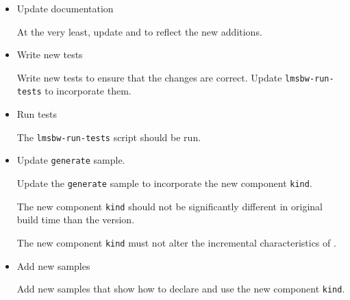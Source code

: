 \begin{itemize}
\item Update documentation

  At the very least, update  and 
  to reflect the new additions.

\item Write new tests

  Write new tests to ensure that the changes are correct.  Update
  \texttt{lmsbw-run-tests} to incorporate them.

\item Run tests

  The \texttt{lmsbw-run-tests} script should be run.

\item Update \texttt{generate} sample.

  Update the \texttt{generate} sample to incorporate the new component
  \texttt{kind}.

  The new component \texttt{kind} should not be significantly
  different in original build time than the \makefile version.

  The new component \texttt{kind} must not alter the incremental
  characteristics of \lmsbw.

\item Add new samples

  Add new samples that show how to declare and use the new component
  \texttt{kind}.

\end{itemize}


